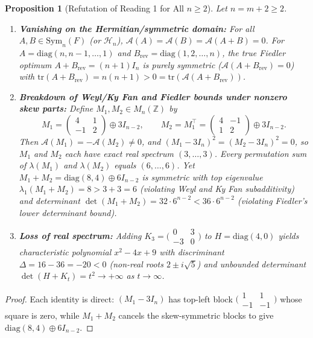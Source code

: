 \documentclass[11pt,a4paper]{article}
\theoremstyle{plain}
\newtheorem{proposition}[theorem]{Proposition}
\theoremstyle{definition}
\newcommand{\Z}{\mathbb{Z}}
\newcommand{\tr}{\mathrm{tr}}
\newcommand{\diag}{\mathrm{diag}}
\newcommand{\Sym}{\mathrm{Sym}}
\newcommand{\Herm}{\mathcal{H}}
\newcommand{\Ap}{\mathcal{A}}
\begin{document}
\begin{proposition}[Refutation of Reading 1 for All $n \ge 2$]\label{prop:refute1}
Let $n = m + 2 \ge 2$.
\begin{enumerate}
  \item \textbf{Vanishing on the Hermitian/symmetric domain:} For all $A, B \in \Sym_n(F)$ (or $\Herm_n$), $\Ap(A) = \Ap(B) = \Ap(A + B) = 0$. For $A = \diag(n, n-1, \dots, 1)$ and $B_{\mathrm{rev}} = \diag(1, 2, \dots, n)$, the true Fiedler optimum $A + B_{\mathrm{rev}} = (n+1) I_n$ is purely symmetric ($\Ap(A + B_{\mathrm{rev}}) = 0$) with $\tr(A + B_{\mathrm{rev}}) = n(n+1) > 0 = \tr(\Ap(A + B_{\mathrm{rev}}))$.
  \item \textbf{Breakdown of Weyl/Ky Fan and Fiedler bounds under nonzero skew parts:} Define $M_1, M_2 \in M_n(\Z)$ by
  \[
    M_1 = \begin{pmatrix} 4 & 1 \\ -1 & 2 \end{pmatrix} \oplus 3 I_{n-2},
    \qquad
    M_2 = M_1^\top = \begin{pmatrix} 4 & -1 \\ 1 & 2 \end{pmatrix} \oplus 3 I_{n-2}.
  \]
  Then $\Ap(M_1) = -\Ap(M_2) \ne 0$, and $(M_1 - 3 I_n)^2 = (M_2 - 3 I_n)^2 = 0$, so $M_1$ and $M_2$ each have exact real spectrum $(3, \dots, 3)$. Every permutation sum of $\lambda(M_1)$ and $\lambda(M_2)$ equals $(6, \dots, 6)$. Yet $M_1 + M_2 = \diag(8, 4) \oplus 6 I_{n-2}$ is symmetric with top eigenvalue $\lambda_1(M_1 + M_2) = 8 > 3 + 3 = 6$ (violating Weyl and Ky Fan subadditivity) and determinant $\det(M_1 + M_2) = 32 \cdot 6^{n-2} < 36 \cdot 6^{n-2}$ (violating Fiedler's lower determinant bound).
  \item \textbf{Loss of real spectrum:} Adding $K_3 = \bigl(\begin{smallmatrix}0 & 3 \\ -3 & 0\end{smallmatrix}\bigr)$ to $H = \diag(4, 0)$ yields characteristic polynomial $x^2 - 4x + 9$ with discriminant $\Delta = 16 - 36 = -20 < 0$ (non-real roots $2 \pm i\sqrt{5}$) and unbounded determinant $\det(H + K_t) = t^2 \to +\infty$ as $t \to \infty$.
\end{enumerate}
\end{proposition}

\begin{proof}
Each identity is direct: $(M_1 - 3 I_n)$ has top-left block $\bigl(\begin{smallmatrix}1 & 1 \\ -1 & -1\end{smallmatrix}\bigr)$ whose square is zero, while $M_1 + M_2$ cancels the skew-symmetric blocks to give $\diag(8, 4) \oplus 6 I_{n-2}$.
\end{proof}
\end{document}
